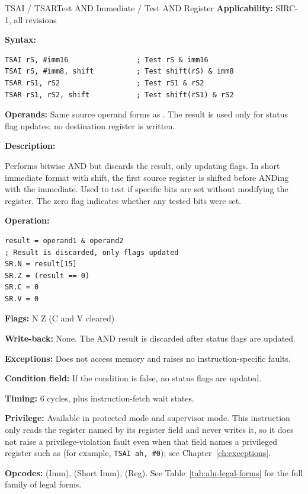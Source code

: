 \begin{instructionbox}{TSAI / TSAR}{Test AND Immediate / Test AND Register}
	\textbf{Applicability:} SIRC-1, all revisions

	\textbf{Syntax:}
	\begin{lstlisting}
TSAI rS, #imm16                ; Test rS & imm16
TSAI rS, #imm8, shift          ; Test shift(rS) & imm8
TSAR rS1, rS2                  ; Test rS1 & rS2
TSAR rS1, rS2, shift           ; Test shift(rS1) & rS2
\end{lstlisting}

	\textbf{Operands:} Same source operand forms as . The result is used only for status flag updates; no
	destination register is written.

	\textbf{Description:}

	Performs bitwise AND but discards the result, only updating flags. In short immediate format with shift, the first
	source register is shifted before ANDing with the immediate. Used to test if specific bits are set without modifying
	the register. The zero flag indicates whether any tested bits were set.

	\textbf{Operation:}
	\begin{verbatim}
result = operand1 & operand2
; Result is discarded, only flags updated
SR.N = result[15]
SR.Z = (result == 0)
SR.C = 0
SR.V = 0
\end{verbatim}

	\textbf{Flags:} N Z (C and V cleared)

	\textbf{Write-back:} None. The AND result is discarded after status flags are updated.

	\textbf{Exceptions:} Does not access memory and raises no instruction-specific faults.

	\textbf{Condition field:} If the condition is false, no status flags are updated.

	\textbf{Timing:} 6 cycles, plus instruction-fetch wait states.

	\textbf{Privilege:} Available in protected mode and supervisor mode. This instruction only reads the register named
	by its register field and never writes it, so it does not raise a privilege-violation fault even when that field
	names a privileged register such as  (for example, \texttt{TSAI ah, \#0}); see
	Chapter~\ref{ch:exceptions}.

	\textbf{Opcodes:}  (Imm),  (Short Imm),  (Reg). See Table~\ref{tab:alu-legal-forms} for the full family of legal forms.


\end{instructionbox}

